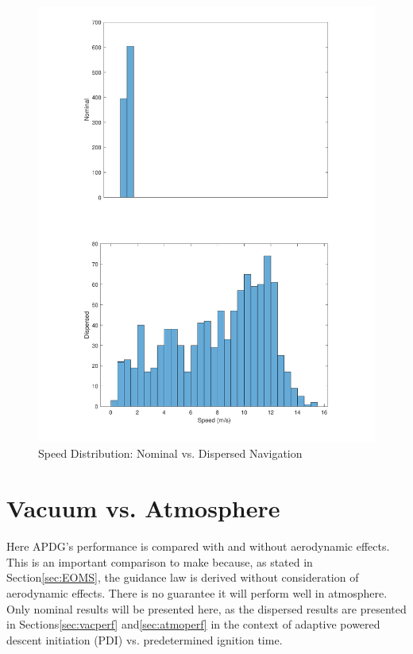 \begin{figure}[H]
	\centering
	\begin{minipage}{4.3 in}
		\includegraphics[width=\linewidth]{Figures/hspdnavvsnonav.pdf}
		\caption{Speed Distribution: Nominal vs. Dispersed Navigation \label{fig:hspdnavvsnonav} }
	\end{minipage}
\end{figure}

\section{Vacuum vs. Atmosphere} \label{sec:atmovsvac}
Here APDG's performance is compared with and without aerodynamic effects. This is an important comparison to make because, as stated in Section\:\ref{sec:EOMS}, the guidance law is derived without consideration of aerodynamic effects. There is no guarantee it will perform well in atmosphere. Only nominal results will be presented here, as the dispersed results are presented in Sections\:\ref{sec:vacperf} and\:\ref{sec:atmoperf} in the context of adaptive powered descent initiation (PDI) vs. predetermined ignition time.

